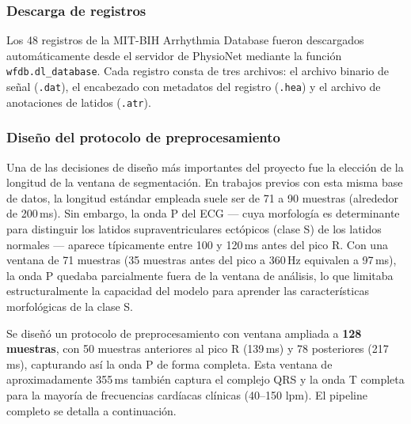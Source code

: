 \subsubsection{Descarga de registros}

Los 48 registros de la MIT-BIH Arrhythmia Database fueron descargados automáticamente desde el servidor de PhysioNet mediante la función \texttt{wfdb.dl\_database}. Cada registro consta de tres archivos: el archivo binario de señal (\texttt{.dat}), el encabezado con metadatos del registro (\texttt{.hea}) y el archivo de anotaciones de latidos (\texttt{.atr}).

\subsubsection{Diseño del protocolo de preprocesamiento}

Una de las decisiones de diseño más importantes del proyecto fue la elección de la longitud de la ventana de segmentación. En trabajos previos con esta misma base de datos, la longitud estándar empleada suele ser de 71 a 90 muestras (alrededor de 200\,ms). Sin embargo, la onda P del ECG — cuya morfología es determinante para distinguir los latidos supraventriculares ectópicos (clase S) de los latidos normales — aparece típicamente entre 100 y 120\,ms antes del pico R. Con una ventana de 71 muestras (35 muestras antes del pico a 360\,Hz equivalen a 97\,ms), la onda P quedaba parcialmente fuera de la ventana de análisis, lo que limitaba estructuralmente la capacidad del modelo para aprender las características morfológicas de la clase S.

Se diseñó un protocolo de preprocesamiento con ventana ampliada a \textbf{128 muestras}, con 50 muestras anteriores al pico R (139\,ms) y 78 posteriores (217\,ms), capturando así la onda P de forma completa. Esta ventana de aproximadamente 355\,ms también captura el complejo QRS y la onda T completa para la mayoría de frecuencias cardíacas clínicas (40–150 lpm). El pipeline completo se detalla a continuación.

